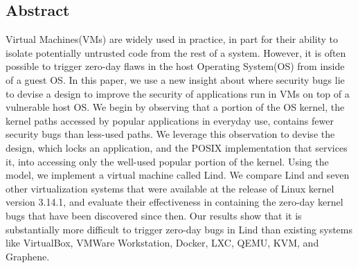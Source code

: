 \subsection*{Abstract}

Virtual Machines(VMs) are widely used in practice, in part for their ability to
isolate potentially untrusted code from the rest of a system.
However, it is often possible to trigger zero-day flaws
in the host Operating System(OS) from inside of a guest OS. 
%
In this paper, we use a new insight about where security bugs lie to devise a design to improve the security of applications
run in VMs on top of a vulnerable host OS. 
We begin by observing that a portion of the OS kernel, the kernel paths accessed
by popular applications in everyday use, contains fewer security bugs than less-used paths. We
leverage this observation to devise the \lip design, which
locks an application, and the POSIX implementation that services it, into
accessing only the well-used popular portion of the kernel.  Using the \lip model, we
implement a virtual machine called Lind.
%
We compare Lind and seven other virtualization systems that were
available at the release of Linux kernel version 3.14.1, and evaluate
their effectiveness in containing the zero-day kernel bugs that have been discovered
since then.
%
Our results show that it is substantially more difficult to trigger zero-day bugs in
Lind than existing systems like VirtualBox, VMWare Workstation, 
Docker, LXC, QEMU, KVM, and Graphene.